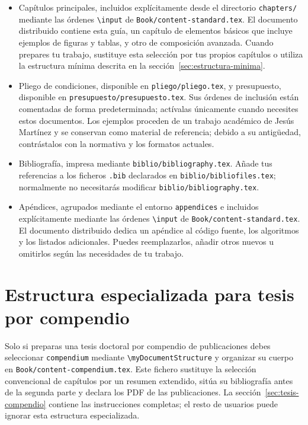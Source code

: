 \begin{itemize}
  \item Capítulos principales, incluidos explícitamente desde el directorio \texttt{chapters/} mediante las órdenes \texttt{\textbackslash{}input} de \texttt{Book/content-standard.tex}. El documento distribuido contiene esta guía, un capítulo de elementos básicos que incluye ejemplos de figuras y tablas, y otro de composición avanzada. Cuando prepares tu trabajo, sustituye esta selección por tus propios capítulos o utiliza la estructura mínima descrita en la sección~\ref{sec:estructura-minima}.
  \item Pliego de condiciones, disponible en \texttt{pliego/pliego.tex}, y presupuesto, disponible en \texttt{presupuesto/presupuesto.tex}. Sus órdenes de inclusión están comentadas de forma predeterminada; actívalas únicamente cuando necesites estos documentos. Los ejemplos proceden de un trabajo académico de Jesús Martínez y se conservan como material de referencia; debido a su antigüedad, contrástalos con la normativa y los formatos actuales.
  \item Bibliografía, impresa mediante \texttt{biblio/bibliography.tex}. Añade tus referencias a los ficheros \texttt{.bib} declarados en \texttt{biblio/bibliofiles.tex}; normalmente no necesitarás modificar \texttt{biblio/bibliography.tex}.
  \item Apéndices, agrupados mediante el entorno \texttt{appendices} e incluidos explícitamente mediante las órdenes \texttt{\textbackslash{}input} de \texttt{Book/content-standard.tex}. El documento distribuido dedica un apéndice al código fuente, los algoritmos y los listados adicionales. Puedes reemplazarlos, añadir otros nuevos u omitirlos según las necesidades de tu trabajo.
\end{itemize}

\section{Estructura especializada para tesis por compendio}

Solo si preparas una tesis doctoral por compendio de publicaciones debes seleccionar \texttt{compendium} mediante \texttt{\textbackslash{}myDocumentStructure} y organizar su cuerpo en \texttt{Book/content-compendium.tex}. Este fichero sustituye la selección convencional de capítulos por un resumen extendido, sitúa su bibliografía antes de la segunda parte y declara los PDF de las publicaciones. La sección~\ref{sec:tesis-compendio} contiene las instrucciones completas; el resto de usuarios puede ignorar esta estructura especializada.

